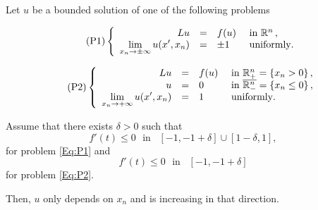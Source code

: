 \begin{proposition}
\label{Prop:HalfSpaceLimUnif}
Let $u$ be a bounded solution of one of the following problems

\begin{equation}
\leqnomode
\tag{P1}
\label{Eq:P1}
\beqc{\PDEsystem}
L u &=& f(u)  &\textrm{ in }\R^n\,,\\
\ds \lim_{x_n \to \pm \infty} u(x',x_n) &=& \pm 1 \,\,\, &\textrm{ uniformly}.
\eeqc
\end{equation}

\begin{equation}
\leqnomode
\tag{P2}
\label{Eq:P2}
\beqc{\PDEsystem}
L u &=& f(u)  &\textrm{ in }\R^n_+ = \{ x_n>0\} \,,\\ 
u &=& 0  &\textrm{ in }\overline{\R^n_-} = \{ x_n\leq 0\}\,,\\
\ds \lim_{x_n \to + \infty} u(x',x_n) &=& 1 \,\,\, &\textrm{ uniformly}.
\eeqc
\end{equation}

\reqnomode

Assume that there exists $\delta > 0$ such that
$$ f'(t) \leq 0 \,\, \text{ in } \,\,\, [-1,-1+\delta]\cup[1-\delta,1], $$
for problem \eqref{Eq:P1} and
$$ f'(t) \leq 0 \,\, \text{ in } \,\,\, [-1,-1+\delta] $$
for problem \eqref{Eq:P2}.

Then, $u$ only depends on $x_n$ and is increasing in that direction.
\end{proposition}

